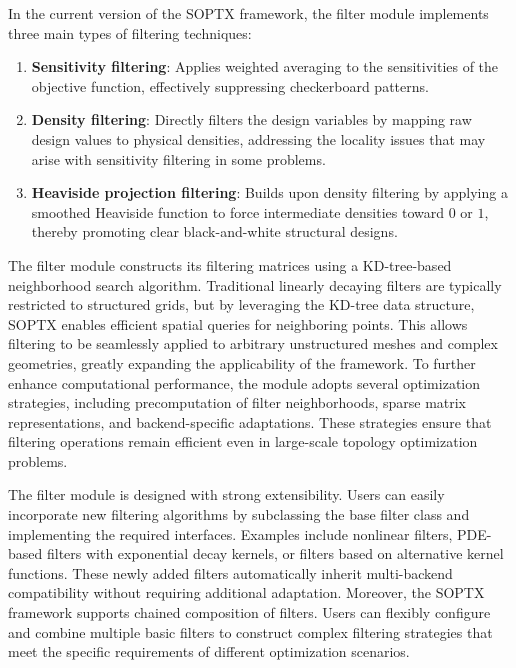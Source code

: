 \documentclass[mathpazo]{cicp}
\begin{document}
In the current version of the SOPTX framework, the filter module implements three main types of filtering techniques:
\begin{enumerate}
	\item \textbf{Sensitivity filtering}: Applies weighted averaging to the sensitivities of the objective function, effectively suppressing checkerboard patterns.
	\item \textbf{Density filtering}: Directly filters the design variables by mapping raw design values to physical densities, addressing the locality issues that may arise with sensitivity filtering in some problems.
	\item \textbf{Heaviside projection filtering}: Builds upon density filtering by applying a smoothed Heaviside function to force intermediate densities toward $0$ or $1$, thereby promoting clear black-and-white structural designs.
\end{enumerate}

The filter module constructs its filtering matrices using a KD-tree-based neighborhood search algorithm. Traditional linearly decaying filters are typically restricted to structured grids, but by leveraging the KD-tree data structure, SOPTX enables efficient spatial queries for neighboring points. This allows filtering to be seamlessly applied to arbitrary unstructured meshes and complex geometries, greatly expanding the applicability of the framework. To further enhance computational performance, the module adopts several optimization strategies, including precomputation of filter neighborhoods, sparse matrix representations, and backend-specific adaptations. These strategies ensure that filtering operations remain efficient even in large-scale topology optimization problems.

The filter module is designed with strong extensibility. Users can easily incorporate new filtering algorithms by subclassing the base filter class and implementing the required interfaces. Examples include nonlinear filters, PDE-based filters with exponential decay kernels, or filters based on alternative kernel functions. These newly added filters automatically inherit multi-backend compatibility without requiring additional adaptation. Moreover, the SOPTX framework supports chained composition of filters. Users can flexibly configure and combine multiple basic filters to construct complex filtering strategies that meet the specific requirements of different optimization scenarios.
\end{document}
